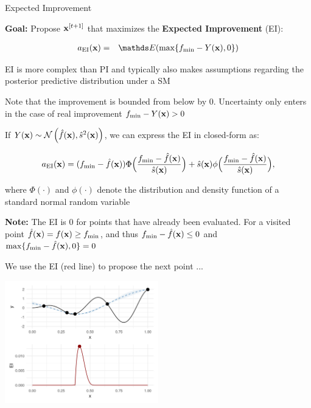 \documentclass[11pt,compress,t,notes=noshow, xcolor=table]{beamer}
\begin{document}
\begin{vbframe}{Expected Improvement}

\textbf{Goal:} Propose $\mathbf{x}^{[t+1]}$ that maximizes the \textbf{Expected Improvement} (EI): 

\vspace*{-0.5cm}

\begin{eqnarray*}
  a_{\text{EI}}(\xv) &=& \E(\max\{\fmin - Y(\xv), 0\}) \\
\end{eqnarray*} 

\vspace*{-0.5cm}

EI is more complex than PI and typically also makes assumptions regarding the posterior predictive distribution under a SM\\

\vspace{1em}

Note that the improvement is bounded from below by $0$. Uncertainty only enters in the case of real improvement $f_{\min} - Y(\mathbf{x}) > 0$

\framebreak

If $Y(\mathbf{x}) \sim \mathcal{N}\left(\hat{f}(\mathbf{x}), \hat{s}^2(\mathbf{x})\right)$, we can express the EI in closed-form as: 

$$
a_{\text{EI}}(\mathbf{x}) = (f_{\min}-\hat{f}(\mathbf{x})) \Phi \Big(\frac{f_{\min} - \hat{f}(\mathbf{x})}{\hat{s}(\mathbf{x})}\Big) + \hat{s}(\mathbf{x}) \phi\Big(\frac{f_{\min}-\hat{f}(\mathbf{x})}{\hat{s}(\mathbf{x})}\Big), 
$$

where $\Phi(\cdot)$ and $\phi(\cdot)$ denote the distribution and density function of a standard normal random variable

\vfill

\begin{footnotesize}
\textbf{Note:} The EI is $0$ for points that have already been evaluated. For a visited point $\hat{f}(\mathbf{x}) = f(\mathbf{x}) \ge f_{\min}$, and thus $f_{\min} - \hat{f}(\mathbf{x}) \le 0$ and $\max\{f_{\min} - \hat{f}(\mathbf{x}), 0\} = 0$
\end{footnotesize}

\framebreak

We use the EI (red line) to propose the next point ...

\begin{center}
  \includegraphics[width = 0.5\textwidth]{figure_man/bayesian_loop_1.png}
\end{center}


\end{vbframe}
\end{document}
